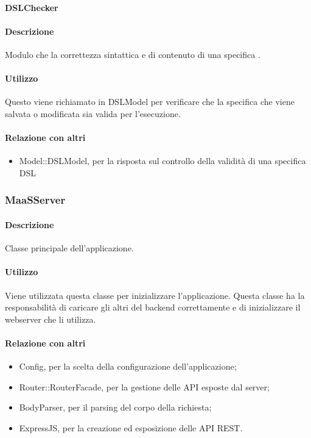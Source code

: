 \paragraph{DSLChecker}
\paragraph*{Descrizione}
Modulo che  la correttezza sintattica e di contenuto di una specifica .

\paragraph*{Utilizzo}
Questo  viene richiamato in DSLModel per verificare che la specifica  che viene salvata o modificata sia valida per l'esecuzione.

\paragraph*{Relazione con altri }
\begin{itemize}
\item Model::DSLModel, per la risposta sul controllo della validità di una specifica DSL
\end{itemize}

\subsubsection{MaaSServer}
\paragraph*{Descrizione}
Classe principale dell'applicazione.

\paragraph*{Utilizzo}
Viene utilizzata questa classe per inizializzare l'applicazione. Questa classe ha la responsabilità di caricare gli altri  del backend correttamente e di inizializzare il webserver che li utilizza.
\paragraph*{Relazione con altri }
\begin{itemize}
\item Config, per la scelta della configurazione dell'applicazione;
\item Router::RouterFacade, per la gestione delle API esposte dal server;
\item BodyParser, per il parsing del corpo della richiesta;
\item ExpressJS, per la creazione ed esposizione delle API REST.
\end{itemize}

